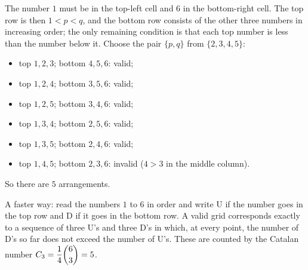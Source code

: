 The number $1$ must be in the top-left cell and $6$ in the bottom-right cell. The top row is then $1<p<q$, and the bottom row consists of the other three numbers in increasing order; the only remaining condition is that each top number is less than the number below it. Choose the pair $\{p,q\}$ from $\{2,3,4,5\}$:
\begin{itemize}
\item top $1,2,3$; bottom $4,5,6$: valid;
\item top $1,2,4$; bottom $3,5,6$: valid;
\item top $1,2,5$; bottom $3,4,6$: valid;
\item top $1,3,4$; bottom $2,5,6$: valid;
\item top $1,3,5$; bottom $2,4,6$: valid;
\item top $1,4,5$; bottom $2,3,6$: invalid ($4>3$ in the middle column).
\end{itemize}
So there are $\boxed{5}$ arrangements.

A faster way: read the numbers $1$ to $6$ in order and write U if the number goes in the top row and D if it goes in the bottom row. A valid grid corresponds exactly to a sequence of three U's and three D's in which, at every point, the number of D's so far does not exceed the number of U's. These are counted by the Catalan number $C_3=\dfrac{1}{4}\dbinom63=5$.
